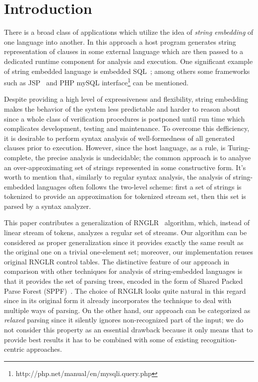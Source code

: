 \section*{Introduction}
There is a broad class of applications which utilize the idea of \emph{string embedding} of one 
language into another. In this approach a host program generates string representation of 
clauses in some external language which are then passed to a dedicated runtime 
component for analysis and execution. One significant example of string embedded 
language is embedded SQL~\cite{DSQLISO}; among others some frameworks 
such as JSP~\cite{JSP} and PHP mySQL interface\footnote{http://php.net/manual/en/mysqli.query.php} 
can be mentioned.

Despite providing a high level of expressiveness and flexibility, string embedding makes the 
behavior of the system less predictable and harder to reason about since a whole class of 
verification procedures is postponed until run time which complicates development, 
testing and maintenance. To overcome this defficiency, it is desirable to perform syntax 
analysis of well-formedness of all generated clauses prior to execution. However, since the 
host language, as a rule, is Turing-complete, the precise analysis is undecidable; the common 
approach is to analyse an over-approximating set of strings represented in some constructive form. 
It's worth to mention that, similarly to regular syntax analysis, the analysis of string-embedded 
languages often follows the two-level scheme: first a set of strings is tokenized to provide an 
approximation for tokenized stream set, then this set is parsed by a syntax analyzer.

This paper contributes a generalization of RNGLR~\cite{RNGLR} algorithm, which, instead of
linear stream of tokens, analyzes a regular set of streams. Our algorithm can be considered as
proper generalization since it provides exactly the same result as the original one on a
trivial one-element set; moreover, our implementation reuses original RNGLR control tables. The distinctive 
feature of our approach in comparison with other techniques for analysis of string-embedded 
languages is that it provides the set of parsing trees, encoded in the form of Shared Packed 
Parse Forest (SPPF)~\cite{SPPF}. The choice of RNGLR looks quite natural in this regard
since in its original form it already incorporates the technique to deal with multiple
ways of parsing. On the other hand, our approach can be categorized as \emph{relaxed} 
parsing since it silently ignores non-recognized part of the input; we do not consider this 
property as an essential drawback because it only means that to provide best results
it has to be combined with some of existing recognition-centric approaches.
